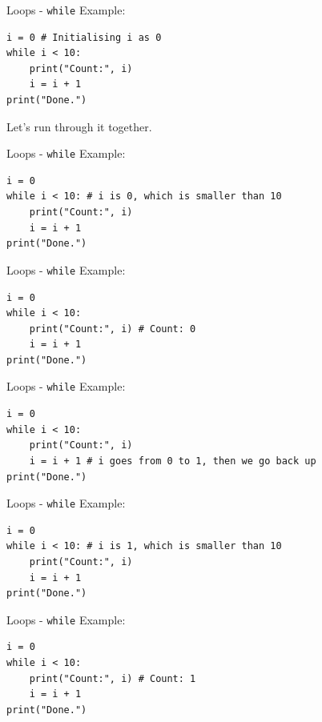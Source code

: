 \documentclass[dvipsnames, svgnames, x11names, handout]{beamer}
\begin{document}
\begin{frame}[fragile]{Loops - \texttt{while}}
Example:
\begin{verbatim}
i = 0 # Initialising i as 0
while i < 10:
    print("Count:", i)
    i = i + 1
print("Done.")
\end{verbatim}
Let's run through it together.
\end{frame}

\addtocounter{framenumber}{-1}

\begin{frame}[fragile]{Loops - \texttt{while}}
Example:
\begin{verbatim}
i = 0
while i < 10: # i is 0, which is smaller than 10
    print("Count:", i)
    i = i + 1
print("Done.")
\end{verbatim}
\end{frame}

\addtocounter{framenumber}{-1}

\begin{frame}[fragile]{Loops - \texttt{while}}
Example:
\begin{verbatim}
i = 0
while i < 10: 
    print("Count:", i) # Count: 0
    i = i + 1
print("Done.")
\end{verbatim}
\end{frame}

\addtocounter{framenumber}{-1}

\begin{frame}[fragile]{Loops - \texttt{while}}
Example:
\begin{verbatim}
i = 0
while i < 10: 
    print("Count:", i)
    i = i + 1 # i goes from 0 to 1, then we go back up
print("Done.")
\end{verbatim}
\end{frame}

\addtocounter{framenumber}{-1}

\begin{frame}[fragile]{Loops - \texttt{while}}
Example:
\begin{verbatim}
i = 0
while i < 10: # i is 1, which is smaller than 10
    print("Count:", i)
    i = i + 1
print("Done.")
\end{verbatim}
\end{frame}

\addtocounter{framenumber}{-1}

\begin{frame}[fragile]{Loops - \texttt{while}}
Example:
\begin{verbatim}
i = 0
while i < 10: 
    print("Count:", i) # Count: 1
    i = i + 1
print("Done.")
\end{verbatim}
\end{frame}
\end{document}
